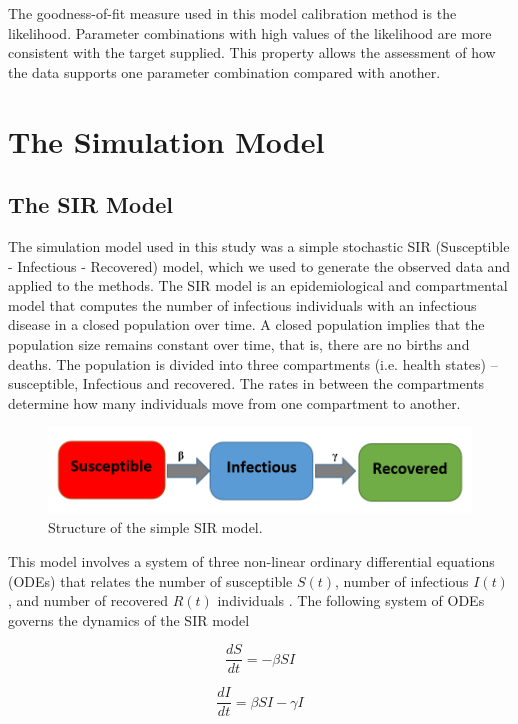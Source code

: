 The goodness-of-fit measure used in this model calibration method is the likelihood. Parameter combinations with high values of the likelihood are more consistent with the target supplied. This property allows the assessment of how the data supports one parameter combination compared with another. 

\section{The Simulation Model}
\subsection{The SIR Model}
The simulation model used in this study was a simple stochastic SIR (Susceptible - Infectious - Recovered) model, which we used to generate the observed data and applied to the methods. The SIR model is an epidemiological and compartmental model that computes the number of infectious individuals with an infectious disease in a closed population over time. A closed population implies that the population size remains constant over time, that is, there are no births and deaths. The population is divided into three compartments (i.e. health states) – susceptible, Infectious and recovered. The rates in between the compartments determine how many individuals move from one compartment to another.

\begin{figure}[h!]
	\includegraphics[width=\linewidth]{sir_model.png}
	\caption{Structure of the simple SIR model.}
	\label{sir_model}
\end{figure}


This model involves a system of three non-linear ordinary differential equations (ODEs) that relates the number of susceptible $S(t)$, number of infectious $I(t)$, and number of recovered $R(t)$ individuals \cite{weiss}. The following system of ODEs governs the dynamics of the SIR model

\begin{equation}
\frac{dS}{dt} = -\beta SI 
\end{equation}

\begin{equation}
\frac{dI}{dt} = \beta SI - \gamma I
\end{equation}

